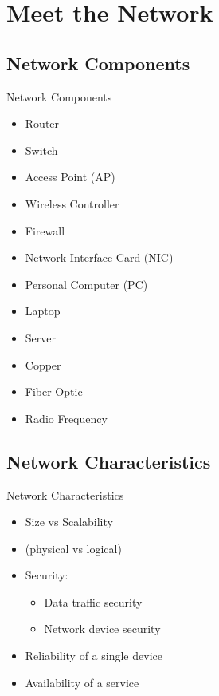 \section[meet]{Meet the Network}

\subsection{Network Components}
\begin{frame}{Network Components}
	\begin{itemize}[<2->]
		\item Router
		\item Switch
		\item Access Point (AP)
		\item Wireless Controller
		\item Firewall
		\item Network Interface Card (NIC)
	\end{itemize}
	\begin{itemize}[<3->]
		\item Personal Computer (PC)
		\item Laptop
		\item Server
	\end{itemize}
	\begin{itemize}[<4->]
		\item Copper
		\item Fiber Optic
		\item Radio Frequency
	\end{itemize}
\end{frame}

\subsection{Network Characteristics}
\begin{frame}{Network Characteristics}
	\begin{itemize}[<+->]
		\item Size vs Scalability
		\item {} (physical vs logical)
		\item Security:
		\begin{itemize}
			\item Data traffic security
			\item Network device security
		\end{itemize}
		\item Reliability of a single device
		\item Availability of a service
	\end{itemize}
\end{frame}

